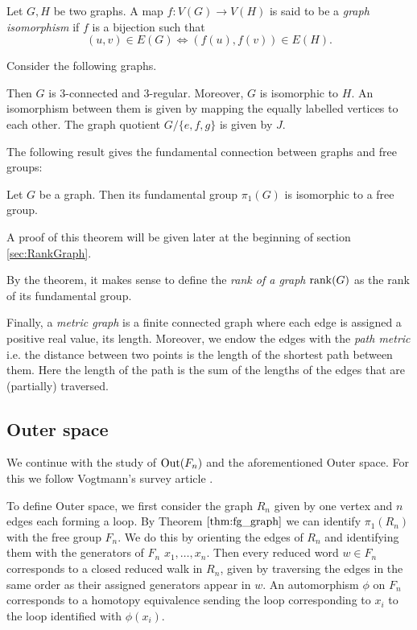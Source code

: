 \begin{definition}
	Let $G,H$ be two graphs. A map $f: V(G) \to V(H)$ is said to be a \emph{graph isomorphism} if $f$ is a bijection such that
	\[
		(u,v) \in E(G) \Leftrightarrow (f(u),f(v)) \in E(H)
	.\] 
\end{definition}

\begin{eg}\label{ex:gAuto}
	Consider the following graphs.

	Then $G$ is $3$-connected and $3$-regular. Moreover, $G$ is isomorphic to $H$.
	An isomorphism between them is given by mapping the equally labelled vertices to each other.
	The graph quotient $G / \{e,f,g\}$ is given by $J$.
\end{eg}

The following result gives the fundamental connection between graphs and free groups:
\begin{theorem}\label{thm:fg_graph}
	Let $G$ be a graph. Then its fundamental group $\pi_{1}(G)$ is isomorphic to a free group.
\end{theorem}
A proof of this theorem will be given later at the beginning of section \ref{sec:RankGraph}.

\begin{definition}
	By the theorem, it makes sense to define the \emph{rank of a graph} $\rank(G)$ as the rank of its fundamental group.

	Finally, a \emph{metric graph} is a finite connected graph where each edge is assigned a positive real value, its length. 
	Moreover, we endow the edges with the \emph{path metric} i.e.
	the distance between two points is the length of the shortest path between them.
	Here the length of the path is the sum of the lengths of the edges that are (partially) traversed.
\end{definition}

\subsection{Outer space}
We continue with the study of $\operatorname{Out}(F_{n})$ and the aforementioned Outer space. 
For this we follow Vogtmann's survey article \cite{vogtmann02}.

To define Outer space, we first consider the graph $R_{n}$ given by one vertex and $n$ edges each forming a loop.
By Theorem $\ref{thm:fg_graph}$ we can identify $\pi_1(R_{n})$ with the free group $F_{n}$.
We do this by orienting the edges of $R_{n}$ and identifying them with the generators of $F_{n}$ $x_1,\ldots,x_{n}$.
Then every reduced word $w \in F_{n}$ corresponds to a closed reduced walk in $R_{n}$, given by traversing the edges in the same order as their assigned generators appear in $w$.
An automorphism $\phi$ on $F_{n}$ corresponds to a homotopy equivalence sending the loop corresponding to $x_{i}$
to the loop identified with $\phi(x_{i})$.

